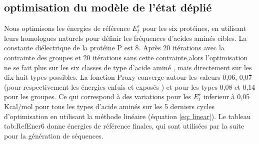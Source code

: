 \subsection{optimisation du modèle de l'état déplié}

Nous optimisons les énergies de référence $E_t^r$ pour les six protéines, en utilisant leurs homologues naturels pour définir les fréquences d'acides aminés cibles. La constante diélectrique de la protéine P est 8. Après 20 itérations avec la contrainte des groupes et 20 itérations sans cette contrainte,alors l'optimisation ne se fait plus sur les six classes de type d'acide aminé , mais directement sur les dix-huit types possibles. La fonction Proxy converge autour les valeurs 0,06, 0,07 (pour respectivement les énergies enfuis et exposés ) et pour les types 0,08 et 0,14 pour les groupes. Ce qui correspond à des variations  pour les $E_t^r$ inferieur à 0,05 Kcal/mol pour tous les types d'acide aminés sur les 5 derniers cycles d'optimisation en utilisant la méthode linéaire (équation \ref{eq: linear}). Le tableau {tab:RefEner6} donne énergies de référence finales, qui sont utilisées par la suite pour la génération de séquences.


